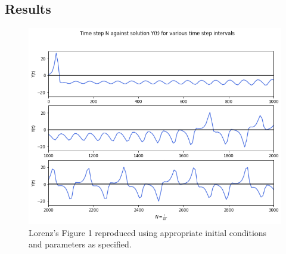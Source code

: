 \documentclass{article}
\begin{document}
\subsection{Results}

\begin{figure}[htbp]
\centerline{\includegraphics[scale=.5]{A3_q2_plot1_1.png}}
\caption{Lorenz's Figure 1 reproduced using appropriate initial conditions and parameters as specified.}
\label{fig}
\end{figure}
\end{document}

